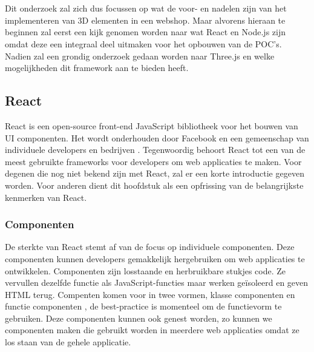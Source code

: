 \chapter{}%
\label{ch:stand-van-zaken}



Dit onderzoek zal zich dus focussen op wat de voor- en nadelen zijn van het implementeren van 3D elementen in een webshop. Maar alvorens hieraan te beginnen zal eerst een kijk genomen worden naar wat React en Node.js zijn omdat deze een integraal deel uitmaken voor het opbouwen van de POC's. Nadien zal een grondig onderzoek gedaan worden naar Three.js en welke mogelijkheden dit framework aan te bieden heeft.

\section{React}

React is een open-source front-end JavaScript bibliotheek voor het bouwen van UI componenten. Het wordt onderhouden door Facebook en een gemeenschap van individuele developers en bedrijven \autocite{Bhupati2021}. Tegenwoordig behoort React tot een van de meest gebruikte frameworks voor developers om web applicaties te maken. Voor degenen die nog niet bekend zijn met React, zal er een korte introductie gegeven worden. Voor anderen dient dit hoofdstuk als een opfrissing van de belangrijkste kenmerken van React.

\subsection{Componenten}
De sterkte van React stemt af van de focus op individuele componenten. Deze componenten kunnen developers gemakkelijk hergebruiken om web applicaties te ontwikkelen. Componenten zijn losstaande en herbruikbare stukjes code. Ze vervullen dezelfde functie als JavaScript-functies maar werken geïsoleerd en geven HTML terug. Compenten komen voor in twee vormen, klasse componenten en functie componenten , de best-practice is momenteel om de functievorm te gebruiken. \autocite{W3Schools2023} Deze componenten kunnen ook genest worden, zo kunnen we componenten maken die gebruikt worden in meerdere web applicaties omdat ze los staan van de gehele applicatie.

